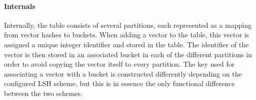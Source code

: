\paragraph{Internals} Internally, the table consists of several partitions, each represented as a mapping from vector hashes to buckets. When adding a vector to the table, this vector is assigned a unique integer identifier and stored in the table. The identifier of the vector is then stored in an associated bucket in each of the different partitions in order to avoid copying the vector itself to every partition. The key used for associating a vector with a bucket is constructed differently depending on the configured LSH scheme, but this is in essence the only functional difference between the two schemes.
